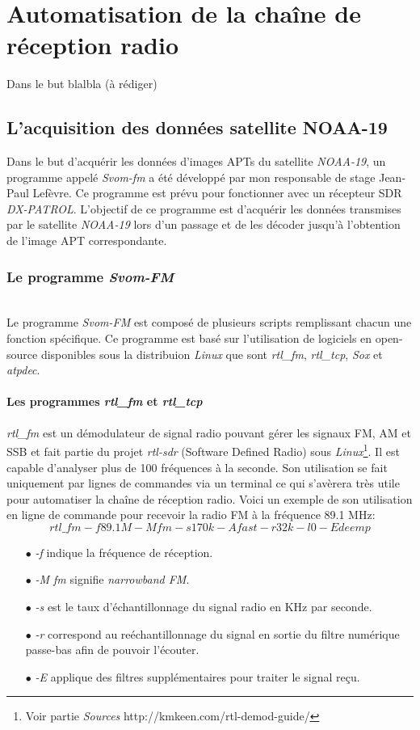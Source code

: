 \documentclass[12pt,fleqn]{book} %
\begin{document}
\part{Automatisation de la chaîne de réception radio}
Dans le but blalbla (à rédiger)
\chapter{L'acquisition des données satellite NOAA-19}
Dans le but d'acquérir les données d'images APTs du satellite \emph{NOAA-19}, un programme appelé \emph{Svom-fm} a été développé par mon responsable de stage Jean-Paul Lefèvre. Ce programme est prévu pour fonctionner avec un récepteur SDR \emph{DX-PATROL}. L'objectif de ce programme est d'acquérir les données transmises par le satellite \emph{NOAA-19} lors d'un passage et de les décoder jusqu'à l'obtention de l'image APT correspondante.
\section{Le programme \emph{Svom-FM}}
~\\\indent Le programme \emph{Svom-FM} est composé de plusieurs scripts remplissant chacun une fonction spécifique. Ce programme est basé sur l'utilisation de logiciels en open-source disponibles sous la distribuion \emph{Linux} que sont \emph{rtl\_fm}, \emph{rtl\_tcp}, \emph{Sox} et \emph{atpdec}.
\subsection{Les programmes \emph{rtl\_fm} et \emph{rtl\_tcp}}
\emph{rtl\_fm} est un démodulateur de signal radio pouvant gérer les signaux FM, AM et SSB et fait partie du projet \emph{rtl-sdr} (Software Defined Radio) sous \emph{Linux}\footnote{Voir partie \emph{Sources} http://kmkeen.com/rtl-demod-guide/}. Il est capable d'analyser plus de 100 fréquences à la seconde. Son utilisation se fait uniquement par lignes de commandes via un terminal ce qui s'avèrera très utile pour automatiser la chaîne de réception radio.
Voici un exemple de son utilisation en ligne de commande pour recevoir la radio FM à la fréquence 89.1 MHz:
$$ rtl\_fm -f 89.1M -M fm -s 170k -A fast -r 32k -l 0 -E deemp $$
\begin{itemize}
 \item[$\bullet$] \emph{-f} indique la fréquence de réception.
 \item[$\bullet$] \emph{-M fm} signifie \emph{narrowband FM}.
 \item[$\bullet$] \emph{-s} est le taux d'échantillonnage du signal radio en KHz par seconde.
 \item[$\bullet$] \emph{-r} correspond au reéchantillonnage du signal en sortie du filtre numérique passe-bas afin de pouvoir l'écouter.
 \item[$\bullet$] \emph{-E} applique des filtres supplémentaires pour traiter le signal reçu.
\end{itemize}
\end{document}
